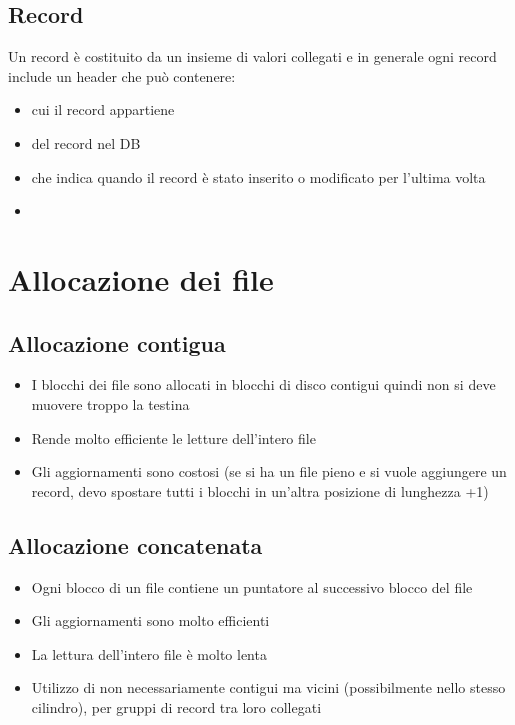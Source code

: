 \documentclass[12pt, a4paper]{report}
\begin{document}
    \subsection{Record}
    Un record è costituito da un insieme di valori collegati e in generale ogni record include un header che può contenere:
    \begin{itemize}
        \item {} cui il record appartiene
        \item {} del record nel DB
        \item {} che indica quando il record è stato inserito o modificato per l'ultima volta
        \item {}
    \end{itemize}
    \section{Allocazione dei file}
    \subsection{Allocazione contigua}
    \begin{itemize}
        \item I blocchi dei file sono allocati in blocchi di disco contigui quindi non si deve muovere troppo la testina
        \item Rende molto efficiente le letture dell'intero file
        \item Gli aggiornamenti sono costosi (se si ha un file pieno e si vuole aggiungere un record, devo spostare tutti i blocchi in un'altra posizione di lunghezza +1)
    \end{itemize}
    \subsection{Allocazione concatenata}
    \begin{itemize}
        \item Ogni blocco di un file contiene un puntatore al successivo blocco del file
        \item Gli aggiornamenti sono molto efficienti
        \item La lettura dell'intero file è molto lenta
        \item Utilizzo di  non necessariamente contigui ma vicini (possibilmente nello stesso cilindro), per gruppi di record tra loro collegati
    \end{itemize}
\end{document}
